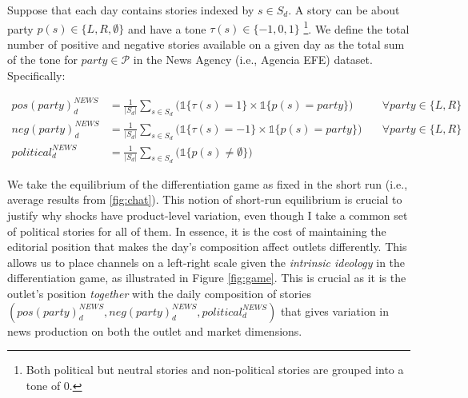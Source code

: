 \documentclass[12pt]{article}
\begin{document}
	Suppose that each day contains stories indexed by $ s \in S_d $. A story can be about party $ p(s) \in \{L, R, \emptyset\} $ and have a tone $ \tau(s) \in \{-1, 0, 1\} $ \footnote{Both political but neutral stories and non-political stories are grouped into a tone of 0.}. We define the total number of positive and negative stories available on a given day as the total sum of the tone for $ party \in \mathcal{P}  $ in the News Agency (i.e., Agencia EFE) dataset. Specifically:
	
	
	
	\begin{equation}\label{eq:first_stage}
		\begin{aligned}
			pos(party)_d^{NEWS}&= \frac{1}{|S_d|} \sum_{s \in S_d}\bigg(\mathds{1}\{\tau(s)=1\} \times \mathds{1}\{p(s)=party\} \bigg)\quad &\forall party \in \{L,R\}\\
			neg(party)_d^{NEWS}&= \frac{1}{|S_d|}\sum_{s \in S_d}\bigg( \mathds{1}\{\tau(s)=-1\} \times \mathds{1}\{p(s)=party\} \bigg) \quad &\forall party \in \{L,R\}\\
			political_d^{NEWS}&=\frac{1}{|S_d|} \sum_{s \in S_d}\bigg(  \mathds{1}\{p(s)\neq\emptyset\} \bigg)
		\end{aligned}
	\end{equation} 
	
	
	We take the equilibrium of the differentiation game as fixed in the short run (i.e., average results from \ref{fig:chat}). This notion of short-run equilibrium is crucial to justify why shocks have product-level variation, even though I take a common set of political stories for all of them. In essence, it is the cost of maintaining the editorial position that makes the day's composition affect outlets differently. This allows us to place channels on a left-right scale given the \textit{intrinsic ideology} in the differentiation game, as illustrated in Figure \ref{fig:game}. This is crucial as it is the outlet's position \textit{together} with the daily composition of stories $ (pos(party)_d^{NEWS},neg(party)_d^{NEWS}, political_d^{NEWS}) $ that gives variation in news production on both the outlet and market dimensions. 
	
\end{document}
